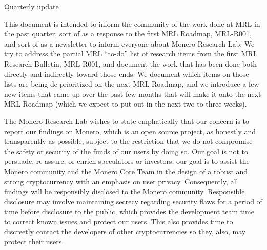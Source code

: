\documentclass[12pt,english]{mrl}
\theoremstyle{definition}
\numberwithin{equation}{section}
\numberwithin{figure}{section}
\numberwithin{equation}{section}
\numberwithin{equation}{section}
\numberwithin{figure}{section}
\begin{document}
\begin{frontmatter}

\begin{fmbox}
{\huge\sffamily Quarterly update} \hfill\setlength{\fboxrule}{0px}\setlength{\fboxsep}{5px}
\dochead{}
\date{\today}
\author[
   addressref={mrl},
   email={bggoode@g.clemson.edu}
]{ }


\address[id=mrl]{
}
\end{fmbox}

\end{frontmatter}

This document is intended to inform the community of the work done at MRL in the past quarter, sort of as a response to the first MRL Roadmap, MRL-R001, and sort of as a newsletter to inform everyone about Monero Research Lab. We try to address the partial MRL ``to-do'' list of research items from the first MRL Research Bulletin, MRL-R001, and document the work that has been done both directly and indirectly toward those ends. We document which items on those lists are being de-prioritized on the next MRL Roadmap, and we introduce a few new items that came up over the past few months that will make it onto the next MRL Roadmap (which we expect to put out in the next two to three weeks).

The Monero Research Lab wishes to state emphatically that our concern is to report our findings on Monero, which is an open source project, as honestly and transparently as possible, subject to the restriction that we do not compromise the safety or security of the funds of our users by doing so. Our goal is not to persuade, re-assure, or enrich speculators or investors; our goal is to assist the Monero community and the Monero Core Team in the design of a robust and strong cryptocurrency with an emphasis on user privacy.  Consequently, all findings will be responsibly disclosed to the Monero community. Responsible disclosure may involve maintaining secrecy regarding security flaws for a period of time before disclosure to the public, which provides the development team time to correct known issues and protect our users. This also provides time to discreetly contact the developers of other cryptocurrencies so they, also, may protect their users.
\end{document}
